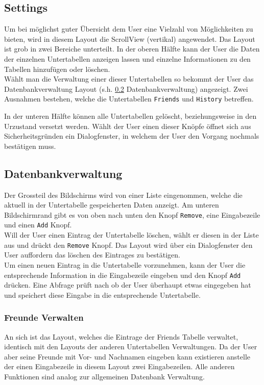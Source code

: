 \subsection{Settings}

Um bei möglichst guter Übersicht dem User eine Vielzahl von Möglichkeiten zu bieten, wird in diesem Layout die ScrollView (vertikal) angewendet. Das Layout ist grob in zwei Bereiche unterteilt. In der oberen Hälfte kann der User die Daten der einzelnen Untertabellen anzeigen lassen und einzelne Informationen zu den Tabellen hinzufügen oder löschen.\\

Wählt man die Verwaltung einer dieser Untertabellen so bekommt der User das Datenbankverwaltung Layout (s.h. \ref{subsec:DBGUI} Datenbankverwaltung) angezeigt. Zwei Ausnahmen bestehen, welche die Untertabellen \texttt{Friends} und \texttt{History} betreffen.

In der unteren Hälfte können alle Untertabellen gelöscht, beziehungsweise in den Urzustand versetzt werden. Wählt der User einen dieser Knöpfe öffnet sich aus Sicherheitsgründen ein Dialogfenster, in welchem der User den Vorgang nochmals bestätigen muss. 

\subsection{Datenbankverwaltung}
\label{subsec:DBGUI}
Der Grossteil des Bildschirms wird von einer Liste eingenommen, welche die aktuell in der Untertabelle gespeicherten Daten anzeigt. Am unteren Bildschirmrand gibt es von oben nach unten den Knopf \texttt{Remove}, eine Eingabezeile und einen \texttt{Add} Knopf.\\

Will der User einen Eintrag der Untertabelle löschen, wählt er diesen in der Liste aus und drückt den \texttt{Remove} Knopf. Das Layout wird über ein Dialogfenster den User auffordern das löschen des Eintrages zu bestätigen.\\

Um einen neuen Eintrag in die Untertabelle vorzunehmen, kann der User die entsprechende Information in die Eingabezeile eingeben und den Knopf \texttt{Add} drücken. Eine Abfrage prüft nach ob der User überhaupt etwas eingegeben hat und speichert diese Eingabe in die entsprechende Untertabelle. 

\subsubsection{Freunde Verwalten}
An sich ist das Layout, welches die Eintrage der Friends Tabelle verwaltet, identisch mit den Layouts der anderen Untertabellen Verwaltungen. Da der User aber seine Freunde mit Vor- und Nachnamen eingeben kann existieren anstelle der einen Eingabezeile in diesem Layout zwei Eingabezeilen. Alle anderen Funktionen sind analog zur allgemeinen Datenbank Verwaltung. 

